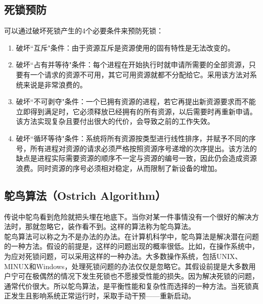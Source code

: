 \subsection{死锁预防}

可以通过破坏死锁产生的4个必要条件来预防死锁：

\begin{enumerate}
    \item 破坏``互斥"条件：由于资源互斥是资源使用的固有特性是无法改变的。

    \item 破坏``占有并等待"条件：每个进程在开始执行时就申请所需要的全部资源，只要有一个请求的资源不可用，其它可用资源就都不分配给它。采用该方法对系统来说是非常浪费的。

    \item 破坏``不可剥夺"条件：一个已拥有资源的进程，若它再提出新资源要求而不能立即得到满足时，它必须释放已经拥有的所有资源，以后需要时再重新申请。该方法实现复杂且要付出很大的代价，会导致之前的工作失效。

    \item 破坏``循环等待"条件：系统将所有资源按类型进行线性排序，并赋予不同的序号，所有进程对资源的请求必须严格按照资源序号递增的次序提出。该方法的缺点是进程实际需要资源的顺序不一定与资源的编号一致，因此仍会造成资源浪费。同时资源的序号必须相对稳定，从而限制了新设备的增加。
\end{enumerate}

\vspace{0.5cm}

\subsection{鸵鸟算法（Ostrich Algorithm）}

传说中鸵鸟看到危险就把头埋在地底下。当你对某一件事情没有一个很好的解决方法时，那就忽略它，装作看不到。这样的算法称为鸵鸟算法。\\

鸵鸟算法可以称之为不是办法的办法。在计算机科学中，鸵鸟算法是解决潜在问题的一种方法。假设的前提是，这样的问题出现的概率很低。比如，在操作系统中，为应对死锁问题，可以采用这样的一种办法。大多数操作系统，包括UNIX、MINUX和Windows，处理死锁问题的办法仅仅是忽略它。其假设前提是大多数用户宁可在极偶然的情况下发生死锁也不愿接受性能的损失。因为解决死锁的问题，通常代价很大。所以鸵鸟算法，是平衡性能和复杂性而选择的一种方法。当死锁真正发生且影响系统正常运行时，采取手动干预——重新启动。

